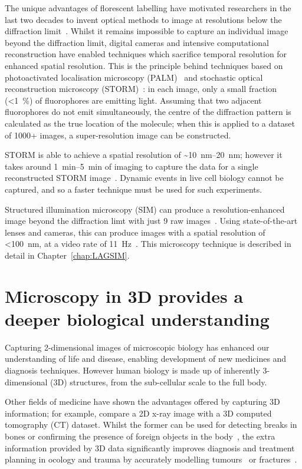 The unique advantages of florescent labelling have motivated researchers in the last two decades to invent optical methods to image at resolutions below the diffraction limit~\cite{cornea2014fluorescence}.
Whilst it remains impossible to capture an individual image beyond the diffraction limit, digital cameras and intensive computational reconstruction have enabled techniques which sacrifice temporal resolution for enhanced spatial resolution.
This is the principle behind techniques based on photoactivated localisation microscopy (PALM)~\cite{betzig2006imaging} and stochastic optical reconstruction microscopy (STORM)~\cite{rust2006sub}: in each image, only a small fraction (<\SI{1}{\percent}) of fluorophores are emitting light.
Assuming that two adjacent fluorophores do not emit simultaneously, the centre of the diffraction pattern is calculated as the true location of the molecule; when this is applied to a dataset of \num{1000}+ images, a super-resolution image can be constructed. 

STORM is able to achieve a spatial resolution of \textasciitilde\SIrange[range-phrase=--]{10}{20}{\nano\metre}; however it takes around \SIrange[range-phrase=--]{1}{5}{\minute} of imaging to capture the data for a single reconstructed STORM image~\cite{heilemann2008subdiffraction}.
Dynamic events in live cell biology cannot be captured, and so a faster technique must be used for such experiments. 

Structured illumination microscopy (SIM) can produce a resolution-enhanced image beyond the diffraction limt with just 9 raw images~\cite{gustafsson2000surpassing}.
Using state-of-the-art lenses and cameras, this can produce images with a spatial resolution of <\SI{100}{\nano\metre}, at a video rate of \SI{11}{\hertz}~\cite{young2016guide}.  
This microscopy technique is described in detail in Chapter~\ref{chap:LAGSIM}. 

\section{Microscopy in 3D provides a deeper biological understanding}
Capturing 2-dimensional images of microscopic biology has enhanced our understanding of life and disease, enabling development of new medicines and diagnosis techniques. %
However human biology is made up of inherently 3-dimensional (3D) structures, from the sub-cellular scale to the full body. 

Other fields of medicine have shown the advantages offered by capturing 3D information; for example, compare a 2D x-ray image with a 3D computed tomography (CT) dataset. 
Whilst the former can be used for detecting breaks in bones or confirming the presence of foreign objects in the body~\cite{markose2009three}, the extra information provided by 3D data significantly improves diagnosis and treatment planning in ocology and trauma by accurately modelling tumours~\cite{zhang2013thin} or fractures~\cite{rangarajan2013three}. 

